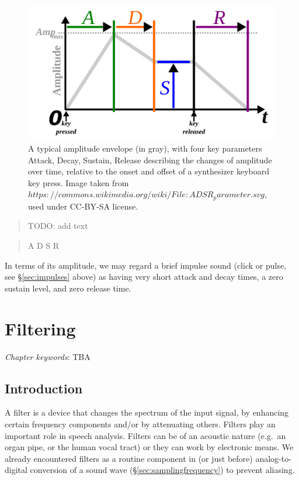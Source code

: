 \documentclass[
]{book}
\begin{document}
\begin{figure}

{\centering \includegraphics{figures/ADSR_parameter} 

}

\caption{A typical amplitude envelope (in gray), with four key parameters Attack, Decay, Sustain, Release describing the changes of amplitude over time, relative to the onset and offset of a synthesizer keyboard key press. Image taken from  $https://commons.wikimedia.org/wiki/File:ADSR_parameter.svg$, used under CC-BY-SA license.}\label{fig:envelope}
\end{figure}

\begin{quote}
TODO: add text
\end{quote}

\begin{quote}
A
D
S
R
\end{quote}

In terms of its amplitude, we may regard a brief impulse sound (click or pulse, see §\ref{sec:impulses} above) as having very short attack and decay times, a zero sustain level, and zero release time.

\chapter{Filtering}\label{ch-filtering}

\emph{Chapter keywords}: TBA

\section{Introduction}\label{introduction}

A filter is a device that changes the spectrum of the input signal, by enhancing certain frequency components and/or by attenuating others. Filters play an important role in speech analysis. Filters can be of an acoustic nature (e.g.~an organ pipe, or the human vocal tract) or they can work by electronic means. We already encountered filters as a routine component in (or just before) analog-to-digital conversion of a sound wave (§\ref{sec:samplingfrequency}) to prevent aliasing.
\end{document}
